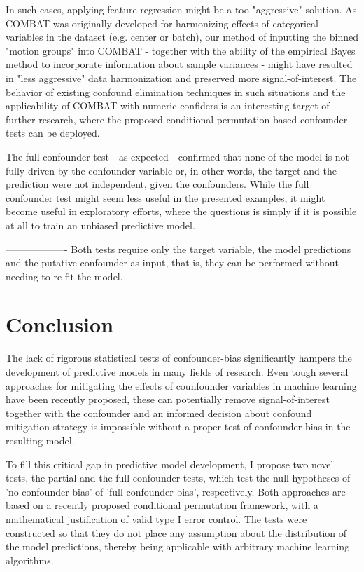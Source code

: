 \documentclass{article}
\begin{document}
In such cases, applying feature regression might be a too "aggressive" solution. As COMBAT was originally developed for harmonizing effects of categorical variables in the dataset (e.g. center or batch), our method of inputting the binned "motion groups" into COMBAT - together with the ability of the empirical Bayes method to incorporate information about sample variances - might have resulted in "less aggressive" data harmonization and preserved more signal-of-interest. 
The behavior of existing confound elimination techniques in such situations and the applicability of COMBAT with numeric confiders is an interesting target of further research, where the proposed conditional permutation based confounder tests can be deployed.

The full confounder test - as expected - confirmed that none of the model is not fully driven by the confounder variable or, in other words, the target and the prediction were not independent, given the confounders. While the full confounder test might seem less useful in the presented examples, it might become useful in exploratory efforts, where the questions is simply if it is possible at all to train an unbiased predictive model.

-------------------
Both tests require only the target variable, the model predictions and the putative confounder as input, that is, they can be performed without needing to re-fit the model.
-----------------

\section{Conclusion}

The lack of rigorous statistical tests of confounder-bias significantly hampers the development of predictive models in many fields of research. Even tough several approaches for mitigating the effects of counfounder variables in machine learning have been recently proposed, these can potentially remove signal-of-interest together with the confounder and an informed decision about confound mitigation strategy is impossible without a proper test of confounder-bias in the resulting model.

To fill this critical gap in predictive model development, I propose two novel tests, the partial and the full confounder tests, which test the null hypotheses of 'no confounder-bias' of 'full confounder-bias', respectively. Both approaches are based on a recently proposed conditional permutation framework, with a mathematical justification of valid type I error control. The tests were constructed so that they do not place any assumption about the distribution of the model predictions, thereby being applicable with arbitrary machine learning algorithms.
\end{document}
